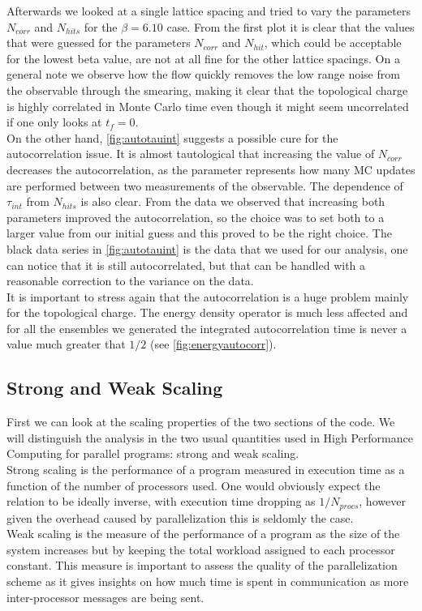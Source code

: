 Afterwards we looked at a single lattice spacing and tried to vary the parameters $N_{corr}$ and $N_{hits}$ for the $\beta=6.10$ case. 
From the first plot it is clear that the values that were guessed for the parameters $N_{corr}$ and $N_{hit}$, which could be acceptable for the lowest beta value, are not at all fine for the other lattice spacings. On a general note we observe how the flow quickly removes the low range noise from the observable through the smearing, making it clear that the topological charge is highly correlated in Monte Carlo time even though it might seem uncorrelated if one only looks at $t_f = 0$. \\
On the other hand, \cref{fig:autotauint} suggests a possible cure for the autocorrelation issue. It is almost tautological that increasing the value of $N_{corr}$ decreases the autocorrelation, as the parameter represents how many MC updates are performed between two measurements of the observable. The dependence of $\tau_{int}$ from $N_{hits}$ is also clear. From the data we observed that increasing both parameters improved the autocorrelation, so the choice was to set both to a larger value from our initial guess and this proved to be the right choice. The black data series in  \cref{fig:autotauint} is the data that we used for our analysis, one can notice that it is still autocorrelated, but that can be handled with a reasonable correction to the variance on the data. \\
It is important to stress again that the autocorrelation is a huge problem mainly for the topological charge. The energy density operator is much less affected and for all the ensembles we generated the integrated autocorrelation time is never a value much greater that $1/2$ (see \cref{fig:energyautocorr}). 
 
\FloatBarrier
\subsection{Strong and Weak Scaling}
First we can look at the scaling properties of the two sections of the code. We will distinguish the analysis in the two usual quantities used in High Performance Computing for parallel programs: strong and weak scaling. \\
Strong scaling is the performance of a program measured in execution time as a function of the number of processors used. One would obviously expect the relation to be ideally inverse, with execution time dropping as $1/N_{procs}$, however given the overhead caused by parallelization this is seldomly the case. \\
Weak scaling is the measure of the performance of a program as the size of the system increases but by keeping the total workload assigned to each processor constant. This measure is important to assess the quality of the parallelization scheme as it gives insights on how much time is spent in communication as more inter-processor messages are being sent.


